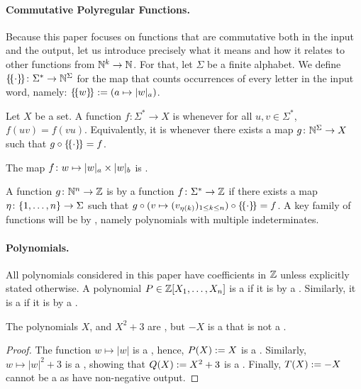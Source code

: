 \AP 
\paragraph{Commutative Polyregular Functions.}
Because this paper focuses on functions that are commutative both in the
input and the output, let us introduce precisely what it means and how it
relates to other functions from $\mathbb{N}^k \to \mathbb{N}$. For that, let $\Sigma$ be a
finite alphabet. We define $\commute \colon \Sigma^* \to \Nat^\Sigma$ for the
map that counts occurrences of every letter in the input word, namely: $
\commute[w] \defined (a \mapsto \card[a]{w})$.

\AP Let $X$ be a set. A function $f \colon \Sigma^* \to X$ is
 whenever for all $u,v \in \Sigma^*$, $f(uv) = f(vu)$.
Equivalently, it is  whenever there exists a map $g \colon
\mathbb{N}^\Sigma \to X$ such that $g \circ \commute = f$.

\begin{example}
    \label{commutative-function:ex}
    The map $f \colon w \mapsto \card[a]{w} \times \card[b]{w}$ is .
\end{example}

\AP A function $g \colon \mathbb{N}^n \to \mathbb{Z}$ is  by a function
$f \colon \Sigma^* \to \mathbb{Z}$ if there exists a map $\eta \colon \mathopen{\{} 1, \dots,
n \mathclose{\}} \to \Sigma$ such that $g \circ (v \mapsto \seqof{v_{\eta(k)}}{1 \leq k \leq
n}) \circ \commute = f$. A key family of functions will be  by
, namely polynomials with multiple indeterminates.

\AP \paragraph*{Polynomials.} All polynomials considered in this paper have
coefficients in $\mathbb{Z}$ unless explicitly stated otherwise. A polynomial $P \in
\mathbb{Z}[X_1, \dots, X_n]$ is a  if it
is  by a . Similarly, it is a
 if it is  by a
. 

\begin{example}
    \label{negative-not-nrat:ex}
    The polynomials $X$, and $X^2 + 3$ are ,
    but $- X$ is a  that is 
    not a .
\end{example}
\begin{proof}
    The function $w \mapsto |w|$ is a ,
    hence, $P(X) \mathrel{:=} X$ is
    a . Similarly,
    $w \mapsto |w|^2 + 3$ is a ,
    showing that $Q(X) \mathrel{:=} X^2 + 3$
    is a .
    Finally, 
    $T(X) \mathrel{:=} - X$ cannot be 
    a  as 
    have non-negative output.
\end{proof}

